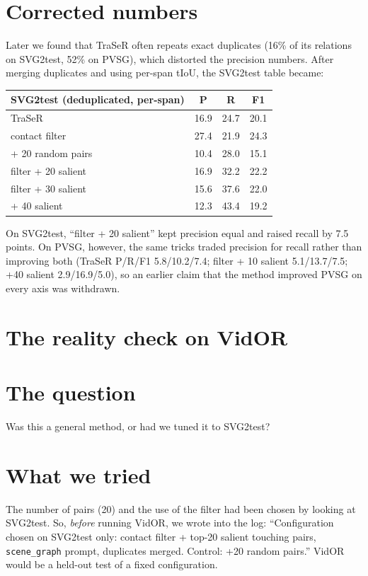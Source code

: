 \documentclass[11pt,openany]{book}
\newcommand{\code}[1]{\texttt{#1}}
\newcommand{\qsec}{\section*{The question}}
\newcommand{\tsec}{\section*{What we tried}}
\begin{document}
\section{Corrected numbers}
Later we found that TraSeR often repeats exact duplicates (16\% of its relations on SVG2test, 52\% on PVSG), which distorted the
precision numbers. After merging duplicates and using per-span tIoU, the SVG2test table became:
\begin{center}
\begin{tabular}{@{}lccc@{}}
\toprule
SVG2test (deduplicated, per-span) & P & R & F1 \\
\midrule
TraSeR & 16.9 & 24.7 & 20.1 \\
contact filter & 27.4 & 21.9 & 24.3 \\
+ 20 random pairs & 10.4 & 28.0 & 15.1 \\
filter + 20 salient & 16.9 & 32.2 & 22.2 \\
filter + 30 salient & 15.6 & 37.6 & 22.0 \\
+ 40 salient & 12.3 & 43.4 & 19.2 \\
\bottomrule
\end{tabular}
\end{center}
On SVG2test, ``filter + 20 salient'' kept precision equal and raised recall by 7.5 points. On PVSG, however, the same tricks traded
precision for recall rather than improving both (TraSeR P/R/F1 5.8/10.2/7.4; filter + 10 salient 5.1/13.7/7.5; +40 salient
2.9/16.9/5.0), so an earlier claim that the method improved PVSG on every axis was withdrawn.

\section{The reality check on VidOR}\label{sec:vidor-prereg}
\qsec
Was this a general method, or had we tuned it to SVG2test?

\tsec
The number of pairs (20) and the use of the filter had been chosen by looking at SVG2test. So, \emph{before} running VidOR, we
wrote into the log: ``Configuration chosen on SVG2test only: contact filter + top-20 salient touching pairs, \code{scene\_graph}
prompt, duplicates merged. Control: +20 random pairs.'' VidOR would be a held-out test of a fixed configuration.
\end{document}
